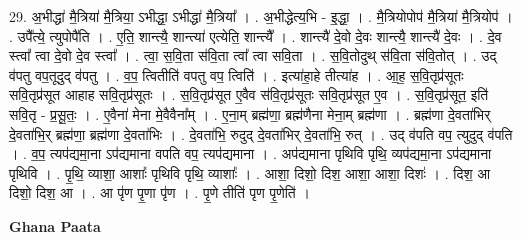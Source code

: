 \documentclass[17pt]{extarticle}
\begin{document}
29. अ॒भीद्धा॑ मै॒त्रिया॑ मै॒त्रिया॒ ऽभीद्धा॒ ऽभीद्धा॑ मै॒त्रिया᳚ । . अ॒भीद्धेत्य॒भि - इ॒द्धा॒ । . मै॒त्रियोपोप॑ मै॒त्रिया॑ मै॒त्रियोप॑ । . उपै᳚त्ये॒ त्युपोपै॑ति । . ए॒ति॒ शान्त्यै॒ शान्त्या॑ एत्येति॒ शान्त्यै᳚ । . शान्त्यै॑ दे॒वो दे॒वः शान्त्यै॒ शान्त्यै॑ दे॒वः । . दे॒व स्त्वा᳚ त्वा दे॒वो दे॒व स्त्वा᳚ । . त्वा॒ स॒वि॒ता स॑वि॒ता त्वा᳚ त्वा सवि॒ता । . स॒वि॒तोदुथ् स॑वि॒ता स॑वि॒तोत् । . उद् व॑पतु वप॒तूदुद् व॑पतु । . व॒प॒ त्वितीति॑ वपतु वप॒ त्विति॑ । . इत्या॑हा॒हे तीत्या॑ह । . आ॒ह॒ स॒वि॒तृप्र॑सूतः सवि॒तृप्र॑सूत आहाह सवि॒तृप्र॑सूतः । . स॒वि॒तृप्र॑सूत ए॒वैव स॑वि॒तृप्र॑सूतः सवि॒तृप्र॑सूत ए॒व । . स॒वि॒तृप्र॑सूत॒ इति॑ सवि॒तृ - प्र॒सू॒तः॒ । . ए॒वैना॑ मेना मे॒वैवैना᳚म् । . ए॒ना॒म् ब्रह्म॑णा॒ ब्रह्म॑णैना मेना॒म् ब्रह्म॑णा । . ब्रह्म॑णा दे॒वता॑भिर् दे॒वता॑भि॒र् ब्रह्म॑णा॒ ब्रह्म॑णा दे॒वता॑भिः । . दे॒वता॑भि॒ रुदुद् दे॒वता॑भिर् दे॒वता॑भि॒ रुत् । . उद् व॑पति वप॒ त्युदुद् व॑पति । . व॒प॒ त्यप॑द्यमा॒ना ऽप॑द्यमाना वपति वप॒ त्यप॑द्यमाना । . अप॑द्यमाना पृथिवि पृथि॒ व्यप॑द्यमा॒ना ऽप॑द्यमाना पृथिवि । . पृ॒थि॒ व्याशा॒ आशाः᳚ पृथिवि पृथि॒ व्याशाः᳚ । . आशा॒ दिशो॒ दिश॒ आशा॒ आशा॒ दिशः॑ । . दिश॒ आ दिशो॒ दिश॒ आ । . आ पृ॑ण पृ॒णा पृ॑ण । . पृ॒णे तीति॑ पृण पृ॒णेति॑ । \newline

\textbf{Ghana Paata } \newline
\end{document}
